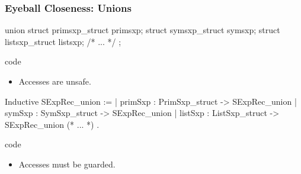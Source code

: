 \documentclass{beamer}
\begin{document}
\begin{frame}[fragile]
    \frametitle{Eyeball Closeness: Unions}

    \begin{changemargin}{-5mm}{-5mm}
\begin{minipage}{.75\textwidth}
\begin{ccode}
union {
    struct primsxp_struct primsxp;
    struct symsxp_struct symsxp;
    struct listsxp_struct listsxp;
    /* ... */
};
\end{ccode}
\end{minipage}
    \begin{minipage}{.3\textwidth}
    {\Cn{} code}

    \begin{itemize}
        \item Accesses are unsafe.
    \end{itemize}
    \end{minipage}

\begin{minipage}{.75\textwidth}
\begin{coqcode}
Inductive SExpRec_union :=
  | primSxp : PrimSxp_struct -> SExpRec_union
  | symSxp : SymSxp_struct -> SExpRec_union
  | listSxp : ListSxp_struct -> SExpRec_union
  (* ... *)
  .
\end{coqcode}
\end{minipage}
    \begin{minipage}{.3\textwidth}
    {\Coq{} code}

    \begin{itemize}
        \item Accesses must be guarded.
    \end{itemize}
    \end{minipage}
\end{changemargin}


\end{frame}
\end{document}
